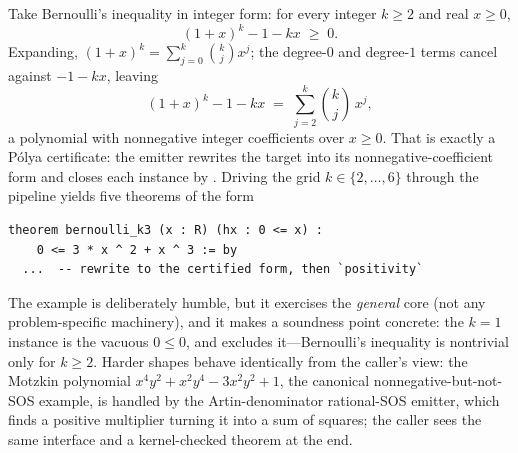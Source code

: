 Take Bernoulli's inequality in integer form: for every integer $k \ge 2$ and real
$x \ge 0$,
\[
(1+x)^k - 1 - kx \;\ge\; 0.
\]
Expanding, $(1+x)^k = \sum_{j=0}^{k}\binom{k}{j}x^j$; the degree-$0$ and degree-$1$
terms cancel against $-1-kx$, leaving
\[
(1+x)^k - 1 - kx \;=\; \sum_{j=2}^{k}\binom{k}{j}\,x^j,
\]
a polynomial with nonnegative integer coefficients over $x \ge 0$. That is exactly
a P\'olya certificate: the emitter rewrites the target into its
nonnegative-coefficient form and closes each instance by . Driving
the grid $k \in \{2,\dots,6\}$ through the pipeline yields five \Lean{} theorems of
the form
\begin{lstlisting}
theorem bernoulli_k3 (x : R) (hx : 0 <= x) :
    0 <= 3 * x ^ 2 + x ^ 3 := by
  ...  -- rewrite to the certified form, then `positivity`
\end{lstlisting}
The example is deliberately humble, but it exercises the \emph{general} core (not
any problem-specific machinery), and it makes a soundness point concrete: the
$k=1$ instance is the vacuous $0 \le 0$, and \Telperion{} excludes it---Bernoulli's
inequality is nontrivial only for $k \ge 2$. Harder shapes behave identically from
the caller's view: the Motzkin polynomial $x^4y^2 + x^2y^4 - 3x^2y^2 + 1$, the
canonical nonnegative-but-not-SOS example, is handled by the Artin-denominator
rational-SOS emitter, which finds a positive multiplier turning it into a sum of
squares; the caller sees the same  interface and a
kernel-checked theorem at the end.
